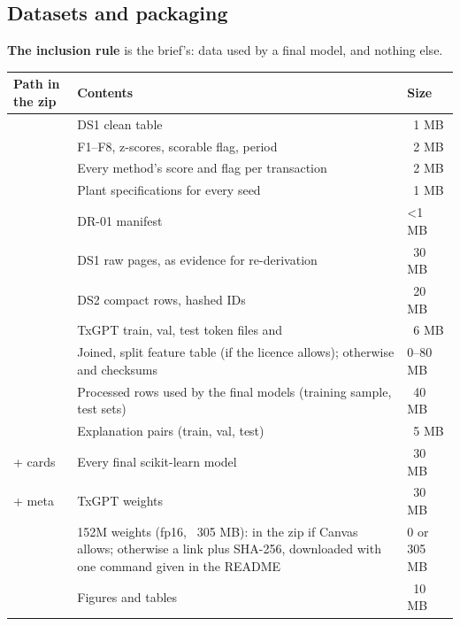 \subsection{Datasets and packaging}
\label{sec:packaging}

\textbf{The inclusion rule} is the brief's: data used by a final model, and nothing else.

\begin{longtable}{@{}L{5.0cm}L{6.0cm}L{2.7cm}@{}}
\toprule
\textbf{Path in the zip} & \textbf{Contents} & \textbf{Size\est{}} \\
\midrule
\endhead
{} & DS1 clean table & ~1 MB \\
 & F1--F8, z-scores, scorable flag, period & ~2 MB \\
 & Every method's score and flag per transaction & ~2 MB \\
 & Plant specifications for every seed & ~1 MB \\
 & DR-01 manifest & <1 MB \\
 & DS1 raw pages, as evidence for re-derivation & ~30 MB \\
 & DS2 compact rows, hashed IDs & ~20 MB \\
 & TxGPT train, val, test token files and  & ~6 MB \\
 & Joined, split feature table (if the licence allows); otherwise  and checksums & 0--80 MB \\
 & Processed rows used by the final models (training sample, test sets) & ~40 MB \\
 & Explanation pairs (train, val, test) & ~5 MB \\
 + cards & Every final scikit-learn model & ~30 MB \\
 + meta & TxGPT weights & ~30 MB \\
 & 152M weights (fp16, ~305 MB): in the zip if Canvas allows; otherwise a link plus SHA-256, downloaded with one command given in the README & 0 or 305 MB \\
 & Figures and tables & ~10 MB \\
\bottomrule
\end{longtable}

